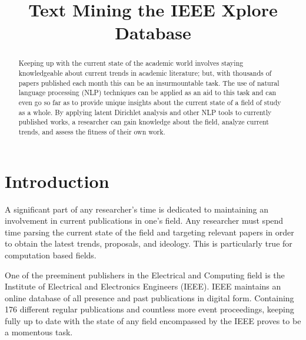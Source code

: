 \documentclass[conference]{IEEEtran}
\begin{document}
\title{Text Mining the IEEE Xplore Database}
\author{
}

\maketitle

\begin{flushright}\end{flushright}
\begin{abstract}
Keeping up with the current state of the academic world involves staying knowledgeable about current trends in academic literature; but, with thousands of papers published each month this can be an insurmountable task. The use of natural language processing (NLP) techniques can be applied as an aid to this task and can even go so far as to provide unique insights about the current state of a field of study as a whole. By applying latent Dirichlet analysis and other NLP tools to currently published works, a researcher can gain knowledge about the field, analyze current trends, and assess the fitness of their own work.
\end{abstract}

\section{Introduction}

A significant part of any researcher's time is dedicated to maintaining an involvement in current publications in one's field. Any researcher must spend time parsing the current state of the field and targeting relevant papers in order to obtain the latest trends, proposals, and ideology. This is particularly true for computation based fields.

One of the preeminent publishers in the Electrical and Computing field is the Institute of Electrical and Electronics Engineers (IEEE). IEEE maintains an online database of all presence and past publications in digital form. Containing 176 different regular publications and countless more event proceedings, keeping fully up to date with the state of any field encompassed by the IEEE proves to be a momentous task.
\end{document}

